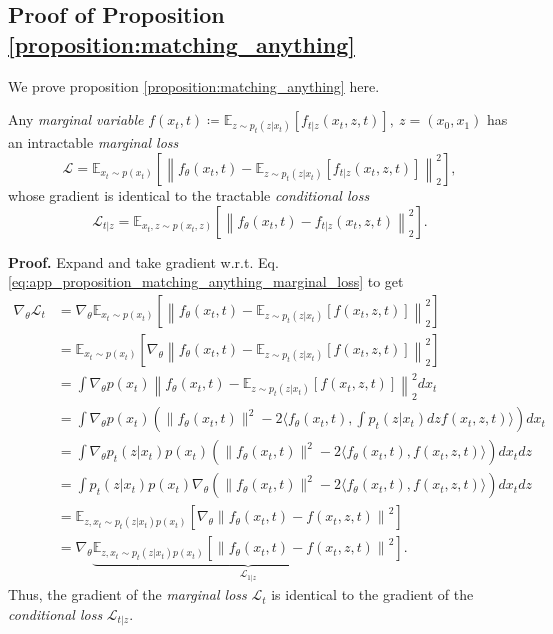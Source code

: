 \subsection{Proof of Proposition \ref{proposition:matching_anything}}
\label{app:proposition_match_anything}
We prove proposition \ref{proposition:matching_anything} here.
\begin{proposition}
    Any \emph{marginal variable} $f(x_t,t)\coloneqq \mathbb{E}_{z\sim p_t(z|x_t)}[f_{t|z}(x_t,z,t)],~z=(x_0,x_1)$ has an intractable \emph{marginal loss}
    \begin{equation}\label{eq:app_proposition_matching_anything_marginal_loss}
        \mathcal{L}=\mathbb{E}_{x_t\sim p(x_t)}\left[\left\|f_{{\theta}}(x_t,t) - \mathbb{E}_{z\sim p_t(z|x_t)}[f_{t|z}(x_t,z,t)]\right\|_2^2\right],
    \end{equation}
    whose gradient is identical to the tractable \emph{conditional loss}
    \begin{equation}
        \mathcal{L}_{t|z}=\mathbb{E}_{x_t,z\sim p(x_t,z)}\left[\left\|f_{\theta}(x_t,t) - f_{t|z}(x_t,z,t)\right\|_2^2\right].
    \end{equation}
\end{proposition}

\textbf{Proof.} Expand and take gradient w.r.t. Eq. \eqref{eq:app_proposition_matching_anything_marginal_loss} to get
\begin{align}
    \nonumber\nabla_\theta \mathcal{L}_t
    &=\nabla_\theta \mathbb{E}_{x_t\sim p(x_t)}\left[\left\|f_{{\theta}}(x_t,t) - \mathbb{E}_{z\sim p_t(z|x_t)}[f(x_t,z,t)]\right\|_2^2\right] \\
    \nonumber&=\mathbb{E}_{x_t\sim p(x_t)}\left[\nabla_\theta \left\|f_{{\theta}}(x_t,t) - \mathbb{E}_{z\sim p_t(z|x_t)}[f(x_t,z,t)]\right\|_2^2\right] \\
    \nonumber&=\int \nabla_\theta p(x_t) \left\|f_{{\theta}}(x_t,t) - \mathbb{E}_{z\sim p_t(z|x_t)}[f(x_t,z,t)]\right\|_2^2 dx_t \\
    \nonumber&=\int \nabla_\theta p(x_t) \left(\|f_{{\theta}}(x_t,t)\|^2 - 2 \langle f_{{\theta}}(x_t,t),  \int p_t(z|x_t) dz f(x_t,z,t) \rangle\right)  dx_t \\ 
    \nonumber&=\int \nabla_\theta  p_t(z|x_t) p(x_t) \left(\|f_{{\theta}}(x_t,t)\|^2 - 2 \langle f_{{\theta}}(x_t,t),  f(x_t,z,t) \rangle\right)  dx_t dz \\ 
    \nonumber&=\int  p_t(z|x_t) p(x_t) \nabla_\theta  \left(\|f_{{\theta}}(x_t,t)\|^2 - 2 \langle f_{{\theta}}(x_t,t),  f(x_t,z,t) \rangle\right)  dx_t dz \\ 
    \nonumber&=\mathbb{E}_{z,x_t\sim p_t(z|x_t) p(x_t)} \left[ \nabla_\theta \left\|f_{{\theta}}(x_t,t) - f(x_t,z,t) \right\|^2 \right]\\ 
    &=\nabla_\theta \underbrace{\mathbb{E}_{z,x_t\sim p_t(z|x_t) p(x_t)} \left[ \left\|f_{{\theta}}(x_t,t) - f(x_t,z,t) \right\|^2 \right]}_{\mathcal{L}_{1|z}}.
\end{align}
Thus, the gradient of the \emph{marginal loss} $\mathcal{L}_{t}$ is identical to the gradient of the \emph{conditional loss} $\mathcal{L}_{t|z}$.


